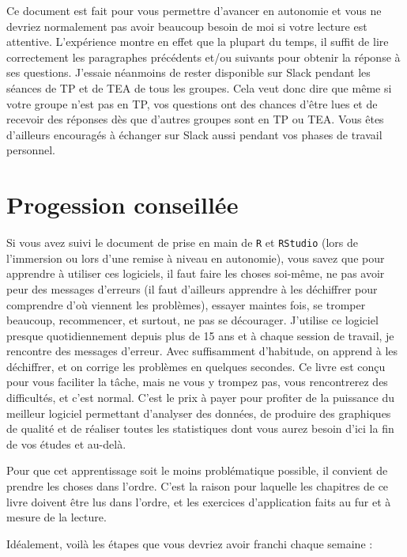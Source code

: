 \documentclass[
  a4paper,
  DIV=11,
  numbers=noendperiod,
  oneside]{scrreprt}
\begin{document}
Ce document est fait pour vous permettre d'avancer en autonomie et vous
ne devriez normalement pas avoir beaucoup besoin de moi si votre lecture
est attentive. L'expérience montre en effet que la plupart du temps, il
suffit de lire correctement les paragraphes précédents et/ou suivants
pour obtenir la réponse à ses questions. J'essaie néanmoins de rester
disponible sur Slack pendant les séances de TP et de TEA de tous les
groupes. Cela veut donc dire que même si votre groupe n'est pas en TP,
vos questions ont des chances d'être lues et de recevoir des réponses
dès que d'autres groupes sont en TP ou TEA. Vous êtes d'ailleurs
encouragés à échanger sur Slack aussi pendant vos phases de travail
personnel.

\hypertarget{progession-conseilluxe9e}{%
\section*{Progession conseillée}\label{progession-conseilluxe9e}}

Si vous avez suivi le document de prise en main de \texttt{R} et
\texttt{RStudio} (lors de l'immersion ou lors d'une remise à niveau en
autonomie), vous savez que pour apprendre à utiliser ces logiciels, il
faut faire les choses soi-même, ne pas avoir peur des messages d'erreurs
(il faut d'ailleurs apprendre à les déchiffrer pour comprendre d'où
viennent les problèmes), essayer maintes fois, se tromper beaucoup,
recommencer, et surtout, ne pas se décourager. J'utilise ce logiciel
presque quotidiennement depuis plus de 15 ans et à chaque session de
travail, je rencontre des messages d'erreur. Avec suffisamment
d'habitude, on apprend à les déchiffrer, et on corrige les problèmes en
quelques secondes. Ce livre est conçu pour vous faciliter la tâche, mais
ne vous y trompez pas, vous rencontrerez des difficultés, et c'est
normal. C'est le prix à payer pour profiter de la puissance du meilleur
logiciel permettant d'analyser des données, de produire des graphiques
de qualité et de réaliser toutes les statistiques dont vous aurez besoin
d'ici la fin de vos études et au-delà.

Pour que cet apprentissage soit le moins problématique possible, il
convient de prendre les choses dans l'ordre. C'est la raison pour
laquelle les chapitres de ce livre doivent être lus dans l'ordre, et les
exercices d'application faits au fur et à mesure de la lecture.

Idéalement, voilà les étapes que vous devriez avoir franchi chaque
semaine :
\end{document}
